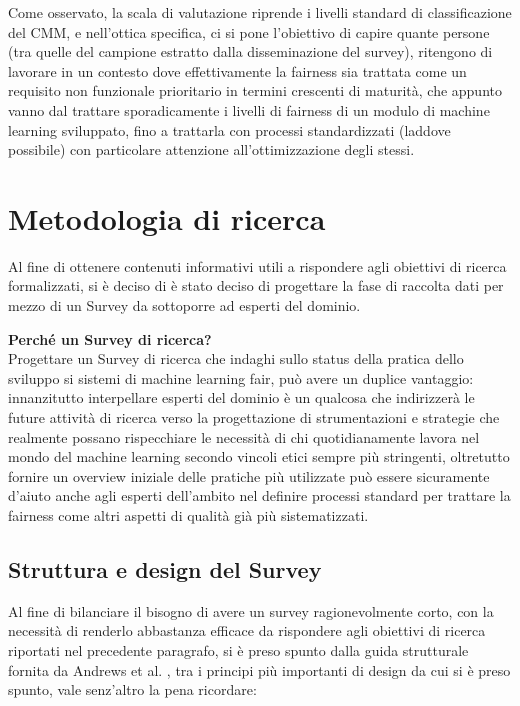  	Come osservato, la scala di valutazione riprende i livelli standard di classificazione del CMM, e nell'ottica specifica, ci si pone l'obiettivo di capire quante persone (tra quelle del campione estratto dalla disseminazione del survey), ritengono di lavorare in un contesto dove effettivamente la fairness sia trattata come un requisito non funzionale prioritario in termini crescenti di maturità, che appunto vanno dal trattare sporadicamente i livelli di fairness di un modulo di machine learning sviluppato, fino a trattarla con processi standardizzati (laddove possibile) con particolare attenzione all'ottimizzazione degli stessi.
    
    \section{Metodologia di ricerca}
     Al fine di ottenere contenuti informativi utili a rispondere agli obiettivi di ricerca formalizzati, si è deciso di è stato deciso di progettare la fase di raccolta dati per mezzo di un Survey da sottoporre ad esperti del dominio.
     
    \textbf{Perché un Survey di ricerca?}\\
    Progettare un Survey di ricerca che indaghi sullo status della pratica dello sviluppo si sistemi di machine learning fair, può avere un duplice vantaggio: innanzitutto interpellare esperti del dominio è un qualcosa che indirizzerà le future attività di ricerca verso la progettazione di strumentazioni e strategie che realmente possano rispecchiare le necessità di chi quotidianamente lavora nel mondo del machine learning secondo vincoli etici sempre più stringenti, oltretutto fornire un overview iniziale delle pratiche più utilizzate può essere sicuramente d'aiuto anche agli esperti dell'ambito nel definire processi standard per trattare la fairness come altri aspetti di qualità già più sistematizzati.
  
    \subsection{Struttura e design del Survey}
    Al fine di bilanciare il bisogno di avere un survey ragionevolmente corto, con la necessità di renderlo abbastanza efficace da rispondere agli obiettivi di ricerca riportati nel precedente paragrafo, si è preso spunto dalla guida strutturale fornita da Andrews et al. \cite{andrews2007conducting}, tra i principi più importanti di design da cui si è preso spunto, vale senz'altro la pena ricordare:
    
